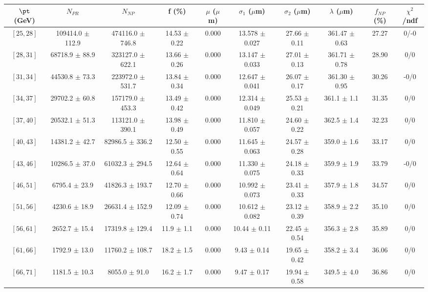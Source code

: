 \begin{tabular}{c||c|c|c|c|c|c|c||c|c}
$\pt$ (GeV) & $N_{PR}$ & $N_{NP}$ & f (\%) & $\mu$ ($\mu$m) & $\sigma_1$ ($\mu$m) & $\sigma_2$ ($\mu$m)  & $\lambda$ ($\mu$m) & $f_{NP}$ (\%) & $\chi^2$/ndf \\
\hline
$[25, 28]$ & 109414.0 $\pm$ 112.9 & 474116.0 $\pm$ 746.8 & 14.53 $\pm$ 0.22 & 0.000 & 13.578 $\pm$ 0.027 & 27.66 $\pm$ 0.11 & 361.47 $\pm$ 0.63 & 27.27 & 0/-0\\
$[28, 31]$ & 68718.9 $\pm$ 88.9 & 323127.0 $\pm$ 622.1 & 13.66 $\pm$ 0.26 & 0.000 & 13.147 $\pm$ 0.033 & 27.01 $\pm$ 0.13 & 361.71 $\pm$ 0.78 & 28.90 & 0/0\\
$[31, 34]$ & 44530.8 $\pm$ 73.3 & 223972.0 $\pm$ 531.7 & 13.84 $\pm$ 0.34 & 0.000 & 12.647 $\pm$ 0.041 & 26.07 $\pm$ 0.17 & 361.30 $\pm$ 0.95 & 30.26 & -0/0\\
$[34, 37]$ & 29702.2 $\pm$ 60.8 & 157179.0 $\pm$ 453.3 & 13.49 $\pm$ 0.42 & 0.000 & 12.314 $\pm$ 0.049 & 25.53 $\pm$ 0.21 & 361.1 $\pm$ 1.1 & 31.35 & 0/0\\
$[37, 40]$ & 20532.1 $\pm$ 51.3 & 113121.0 $\pm$ 390.1 & 13.98 $\pm$ 0.49 & 0.000 & 11.810 $\pm$ 0.057 & 24.60 $\pm$ 0.22 & 362.5 $\pm$ 1.4 & 32.23 & 0/0\\
$[40, 43]$ & 14381.2 $\pm$ 42.7 & 82986.5 $\pm$ 336.2 & 12.50 $\pm$ 0.55 & 0.000 & 11.645 $\pm$ 0.063 & 24.57 $\pm$ 0.28 & 359.0 $\pm$ 1.6 & 33.17 & 0/0\\
$[43, 46]$ & 10286.5 $\pm$ 37.0 & 61032.3 $\pm$ 294.5 & 12.64 $\pm$ 0.64 & 0.000 & 11.330 $\pm$ 0.075 & 24.18 $\pm$ 0.33 & 359.9 $\pm$ 1.9 & 33.79 & -0/0\\
$[46, 51]$ & 6795.4 $\pm$ 23.9 & 41826.3 $\pm$ 193.7 & 12.70 $\pm$ 0.66 & 0.000 & 10.992 $\pm$ 0.073 & 23.41 $\pm$ 0.33 & 357.9 $\pm$ 1.8 & 34.57 & 0/0\\
$[51, 56]$ & 4230.6 $\pm$ 18.9 & 26631.4 $\pm$ 152.9 & 12.09 $\pm$ 0.74 & 0.000 & 10.612 $\pm$ 0.082 & 23.12 $\pm$ 0.39 & 358.9 $\pm$ 2.2 & 35.10 & 0/0\\
$[56, 61]$ & 2652.7 $\pm$ 15.4 & 17319.8 $\pm$ 129.4 & 11.9 $\pm$ 1.1 & 0.000 & 10.44 $\pm$ 0.11 & 22.45 $\pm$ 0.54 & 356.3 $\pm$ 2.8 & 35.89 & 0/0\\
$[61, 66]$ & 1792.9 $\pm$ 13.0 & 11760.2 $\pm$ 108.7 & 18.2 $\pm$ 1.5 & 0.000 & 9.43 $\pm$ 0.14 & 19.65 $\pm$ 0.42 & 358.2 $\pm$ 3.4 & 36.06 & 0/0\\
$[66, 71]$ & 1181.5 $\pm$ 10.3 & 8055.0 $\pm$ 91.0 & 16.2 $\pm$ 1.7 & 0.000 & 9.47 $\pm$ 0.17 & 19.94 $\pm$ 0.58 & 349.5 $\pm$ 4.0 & 36.86 & 0/0\\

\end{tabular}
